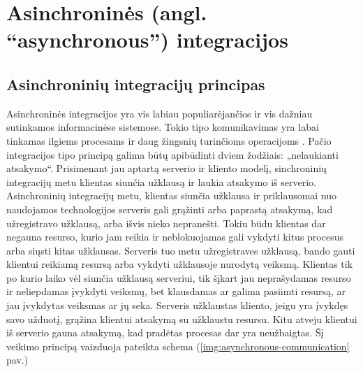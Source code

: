 \section{Asinchroninės (angl. “asynchronous”) integracijos}

\subsection{Asinchroninių integracijų principas}
Asinchroninės integracijos yra vis labiau populiarėjančios ir vis dažniau sutinkamos informacinėse sistemose.
Tokio tipo komunikavimas yra labai tinkamas ilgiems procesams ir daug žingsnių turinčioms operacijoms \cite{Bk2}.
Pačio integracijos tipo principą galima būtų apibūdinti dviem žodžiais: „nelaukianti atsakymo“. Prisimenant jau
aptartą serverio ir kliento modelį, sinchroninių integracijų metu klientas siunčia užklausą ir laukia atsakymo iš serverio.
Asinchroninių integracijų metu, klientas siunčia užklausa ir priklausomai nuo naudojamos technologijos serveris gali grąžinti
arba paprastą atsakymą, kad užregistravo užklausą, arba išvis nieko nepranešti. Tokiu būdu klientas dar negauna resurso, kurio jam reikia
ir neblokuojamas gali vykdyti kitus procesus arba siųsti kitas užklausas. Serveris tuo metu užregistraves užklausą, bando gauti klientui reikiamą
resursą arba vykdyti užklausoje nurodytą veiksmą. Klientas tik po kurio laiko vėl siunčia užklausą serveriui, tik šįkart jau neprašydamas resurso
ir neliepdamas įvykdyti veiksmų, bet klausdamas ar galima pasiimti resursą, ar jau įvykdytas veiksmas ar jų seka.
Serveris užklaustas kliento, jeigu yra įvykdęs savo užduotį, grąžina klientui atsakymą su užklaustu resursu. Kitu atveju klientui iš serverio
gauna atsakymą, kad pradėtas procesas dar yra neužbaigtas. Šį veikimo principą vaizduoja pateikta schema (\ref{img:asynchronous-communication} pav.)

